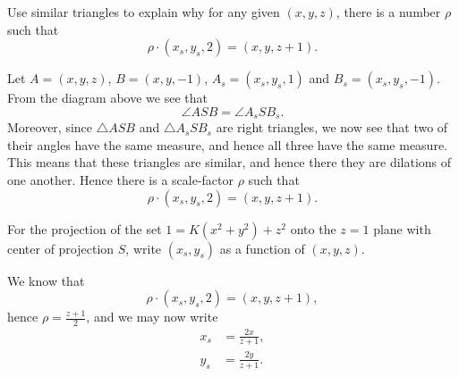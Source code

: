 \documentclass[newpage,hints,handout,12pt,noauthor,nooutcomes]{ximera}
\begin{document}
\begin{problem}
  Use similar triangles to explain why for any given $(x,y,z)$, there
  is a number $\rho$ such that
  \[
  \rho\cdot(x_s,y_s,2) = (x,y,z+1).
  \]
  \begin{freeResponse}
    Let $A = (x,y,z)$, $B= (x,y,-1)$, $A_s = (x_s,y_s,1)$ and
    $B_s=(x_s,y_s,-1)$. From the diagram above we see that
    \[
    \angle ASB = \angle A_s S B_s.
    \]
    Moreover, since $\triangle ASB$ and $\triangle A_s S B_s$ are
    right triangles, we now see that two of their angles have the same
    measure, and hence all three have the same measure. This means
    that these triangles are similar, and hence there they are
    dilations of one another. Hence there is a scale-factor $\rho$
    such that
    \[
    \rho\cdot(x_s,y_s,2) = (x,y,z+1).
    \]
  \end{freeResponse}
\end{problem}

\begin{problem}
  For the projection of the set $1=K\left(x^{2}+y^{2}\right)+z^{2}$
  onto the $z=1$ plane with center of projection $S$, write
  $(x_{s},y_{s})$ as a function of $(x,y,z)$.
  \begin{freeResponse}
    We know that
    \[
    \rho\cdot(x_{s},y_{s},2)=(x,y,z+1),
    \]
    hence $\rho=\frac{z+1}{2}$, and we may now write
    \begin{align*}
      x_{s} &=\frac{2x}{z+1},\\
      y_{s} &=\frac{2y}{z+1}.
    \end{align*}
  \end{freeResponse}
\end{problem}
\end{document}
